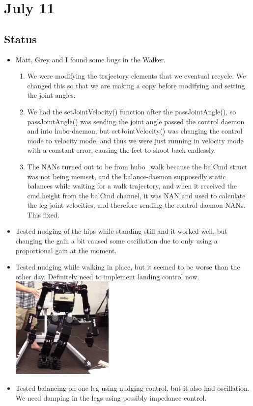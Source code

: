 \documentclass[letterpaper, 10 pt]{report}
\begin{document}
\section*{July 11}
\subsection*{Status}
\begin{itemize}
\item Matt, Grey and I found some bugs in the Walker.
\begin{enumerate}
\item We were modifying the trajectory elements that we eventual recycle. We changed this so that we are making a copy before modifying and setting the joint angles.
\item We had the setJointVelocity() function after the passJointAngle(), so passJointAngle() was sending the joint angle passed the control daemon and into hubo-daemon, but setJointVelocity() was changing the control mode to velocity mode, and thus we were just running in velocity mode with a constant error, causing the feet to shoot back endlessly.
\item The NANs turned out to be from hubo\_walk because the balCmd struct was not being memset, and the balance-daemon supposedly static balances while waiting for a walk trajectory, and when it received the cmd.height from the balCmd channel, it was NAN and used to calculate the leg joint velocities, and therefore sending the control-daemon NANs. This fixed.
\end{enumerate}
\item Tested nudging of the hips while standing still and it worked well, but changing the gain a bit caused some oscillation due to only using a proportional gain at the moment.
\item Tested nudging while walking in place, but it seemed to be worse than the other day. Definitely need to implement landing control now.
\newline \includegraphics[width=5.0cm]{resources/walking-in-place-fail}
\item Tested balancing on one leg using nudging control, but it also had oscillation. We need damping in the legs using possibly impedance control.
\end{itemize}
\end{document}
